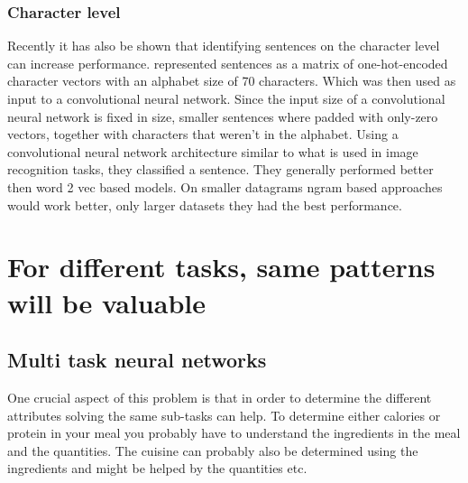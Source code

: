 \documentclass[a4paper]{scrartcl}
\begin{document}
\subsubsection{Character level}
Recently it has also be shown that identifying sentences on the character level can increase performance.  represented sentences as a matrix of one-hot-encoded character vectors with an alphabet size of 70 characters. Which was then used as input to a convolutional neural network. Since the input size of a convolutional neural network is fixed in size, smaller sentences where padded with only-zero vectors, together with characters that weren't in the alphabet. Using a convolutional neural network architecture similar to what is used in image recognition tasks, they classified a sentence. They generally performed better then word 2 vec based models. On smaller datagrams ngram based approaches would work better, only larger datasets they had the best performance. 

\section{For different tasks, same patterns will be valuable}
\subsection{Multi task neural networks}
One crucial aspect of this problem is that in order to determine the different attributes solving the same sub-tasks can help. To determine either calories or protein in your meal you probably have to understand the ingredients in the meal and the quantities. The cuisine can probably also be determined using the ingredients and might be helped by the quantities etc. 
\end{document}
